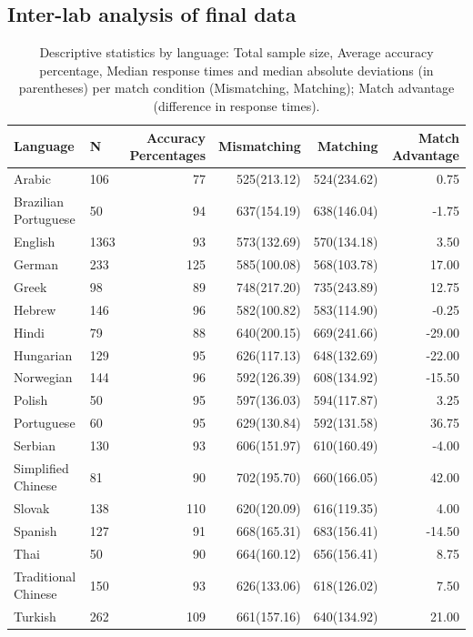 \documentclass[
  man]{apa7}
\begin{document}
\hypertarget{inter-lab-analysis-of-final-data}{%
\subsection{Inter-lab analysis of final data}\label{inter-lab-analysis-of-final-data}}

\begin{table}

\caption{\label{tab:summary-languages}Descriptive statistics by language: Total sample size, Average accuracy percentage, Median response times and median absolute deviations (in parentheses) per match condition (Mismatching, Matching); Match advantage (difference in response times).}
\centering
\begin{tabular}[t]{llrrrr}
\toprule
Language & N & Accuracy Percentages & Mismatching & Matching & Match Advantage\\
\midrule
Arabic & 106 & 77 & 525(213.12) & 524(234.62) & 0.75\\
Brazilian Portuguese & 50 & 94 & 637(154.19) & 638(146.04) & -1.75\\
English & 1363 & 93 & 573(132.69) & 570(134.18) & 3.50\\
German & 233 & 125 & 585(100.08) & 568(103.78) & 17.00\\
Greek & 98 & 89 & 748(217.20) & 735(243.89) & 12.75\\
\addlinespace
Hebrew & 146 & 96 & 582(100.82) & 583(114.90) & -0.25\\
Hindi & 79 & 88 & 640(200.15) & 669(241.66) & -29.00\\
Hungarian & 129 & 95 & 626(117.13) & 648(132.69) & -22.00\\
Norwegian & 144 & 96 & 592(126.39) & 608(134.92) & -15.50\\
Polish & 50 & 95 & 597(136.03) & 594(117.87) & 3.25\\
\addlinespace
Portuguese & 60 & 95 & 629(130.84) & 592(131.58) & 36.75\\
Serbian & 130 & 93 & 606(151.97) & 610(160.49) & -4.00\\
Simplified Chinese & 81 & 90 & 702(195.70) & 660(166.05) & 42.00\\
Slovak & 138 & 110 & 620(120.09) & 616(119.35) & 4.00\\
Spanish & 127 & 91 & 668(165.31) & 683(156.41) & -14.50\\
\addlinespace
Thai & 50 & 90 & 664(160.12) & 656(156.41) & 8.75\\
Traditional Chinese & 150 & 93 & 626(133.06) & 618(126.02) & 7.50\\
Turkish & 262 & 109 & 661(157.16) & 640(134.92) & 21.00\\
\bottomrule
\end{tabular}
\end{table}
\end{document}
